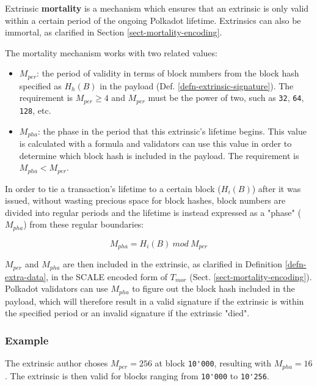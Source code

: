 \begin{definition}
    \label{defn-extrinsic-mortality}
    Extrinsic \textbf{mortality} is a mechanism which ensures that an extrinsic
    is only valid within a certain period of the ongoing Polkadot lifetime.
    Extrinsics can also be immortal, as clarified in Section
    \ref{sect-mortality-encoding}.
    \newline

    The mortality mechanism works with two related values:

    \begin{itemize}
        \item $M_{per}$: the period of validity in terms of block numbers from
        the block hash specified as $H_h(B)$ in the payload (Def.
        \ref{defn-extrinsic-signature}). The requirement is $M_{per} \geq 4$ and
        $M_{per}$ must be the power of two, such as \verb|32|, \verb|64|,
        \verb|128|, etc.
        \item $M_{pha}$: the phase in the period that this extrinsic's lifetime
        begins. This value is calculated with a formula and validators can use
        this value in order to determine which block hash is included in the
        payload. The requirement is $M_{pha} < M_{per}$.
    \end{itemize}

    In order to tie a transaction's lifetime to a certain block ($H_i(B)$) after
    it was issued, without wasting precious space for block hashes, block
    numbers are divided into regular periods and the lifetime is instead
    expressed as a "phase" ($M_{pha}$) from these regular boundaries:

    \[
        M_{pha} = H_i(B)\ mod\ M_{per}
    \]

    $M_{per}$ and $M_{pha}$ are then included in the extrinsic, as clarified in
    Definition \ref{defn-extra-data}, in the SCALE encoded form of $T_{mor}$ (Sect.
    \ref{sect-mortality-encoding}). Polkadot validators can use $M_{pha}$
    to figure out the block hash included in the payload, which will therefore
    result in a valid signature if the extrinsic is within the specified period 
    or an invalid signature if the extrinsic "died".

    \subsubsection*{Example}

    The extrinsic author choses $M_{per} = 256$ at block \verb|10'000|,
    resulting with $M_{pha} = 16$. The extrinsic is then valid for blocks
    ranging from \verb|10'000| to \verb|10'256|.


\end{definition}
